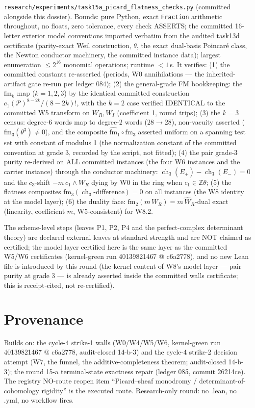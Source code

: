 \documentclass[11pt]{article}
\newcommand{\WR}{W_R}
\newcommand{\WI}{W_I}
\newcommand{\ch}{\operatorname{ch}}
\begin{document}
\texttt{research/experiments/task15a\_picard\_flatness\_checks.py}
(committed alongside this dossier). Bounds: pure Python, exact
\texttt{Fraction} arithmetic throughout, no floats, zero tolerance, every
check ASSERTS; the committed 16-letter exterior model conventions imported
verbatim from the audited task13d certificate (parity-exact Weil
construction, $\theta$, the exact dual-basis Poincar\'e class, the Newton
conductor machinery, the committed instance data); largest enumeration
$\le 2^{16}$ monomial operations; runtime $< 1$\,s. It verifies:
(1) the committed constants re-asserted (periods, W0 annihilations ---
the inherited-artifact gate re-run per ledger 084);
(2) the general-grade FM bookkeeping: the $\mathrm{fm}_k$ map
($k=1,2,3$) by the identical committed construction
$c_1(\mathcal{P})^{8-2k}/(8-2k)!$, with the $k=2$ case verified IDENTICAL
to the committed W5 transform on $\WR,\WI$ (coefficient 1, round trips);
(3) the $k=3$ census: degree-6 words map to degree-2 words
($28 \to 28$), non-vacuity asserted ($\mathrm{fm}_3(\theta^3)\ne 0$),
and the composite $\widehat{\mathrm{fm}}_1\circ \mathrm{fm}_3$ asserted
uniform on a spanning test set with constant of modulus 1 (the
normalization constant of the committed convention at grade 3, recorded
by the script, not fitted);
(4) the pair grade-3 purity re-derived on ALL committed instances (the
four W6 instances and the carrier instance) through the conductor
machinery: $\ch_3(E_+) - \ch_3(E_-) = 0$ and the $c_3$-shift
$-m\,c_1\wedge\WR$ dying by W0 in the ring when $c_1\in\mathbb{Z}\theta$;
(5) the flatness composites $\mathrm{fm}_3(\ch_3\text{-difference}) = 0$
on all instances (the W8 identity at the model layer);
(6) the duality face: $\mathrm{fm}_2(m\,\WR) = m\,\widehat\WR$-dual exact
(linearity, coefficient $m$, W5-consistent) for W8.2.

The scheme-level steps (leaves P1, P2, P4 and the perfect-complex
determinant theory) are declared external leaves at standard strength and
are NOT claimed as certified; the model layer certified here is the same
layer as the committed W5/W6 certificates (kernel-green run 40139821467 @
c6a2778), and no new Lean file is introduced by this round (the kernel
content of W8's model layer --- pair purity at grade 3 --- is already
asserted inside the committed walls certificate; this is receipt-cited, not
re-certified).

\section{Provenance}

Builds on: the cycle-4 strike-1 walls (W0/W4/W5/W6, kernel-green run
40139821467 @ c6a2778, audit-closed 14-b-3) and the cycle-4 strike-2
decision attempt (W7, the funnel, the additive-completeness theorem;
audit-closed 14-b-3); the round 15-a terminal-state exactness repair
(ledger 085, commit 26214ce). The registry NO-route reopen item
``Picard--sheaf monodromy / determinant-of-cohomology rigidity'' is the
executed route. Research-only round: no .lean, no .yml, no workflow fires.
\end{document}

